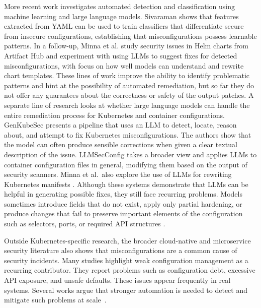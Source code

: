 \documentclass[preprint,12pt]{elsarticle}
\begin{document}
More recent work investigates automated detection and classification using machine learning and large language models. Sivaraman \cite{sivaraman2023mlk8s} shows that features extracted from YAML can be used to train classifiers that differentiate secure from insecure configurations, establishing that misconfigurations possess learnable patterns. In a follow-up, Minna et al. \cite{minna2025helmllm} study security issues in Helm charts from Artifact Hub and experiment with using LLMs to suggest fixes for detected misconfigurations, with focus on how well models can understand and rewrite chart templates. These lines of work improve the ability to identify problematic patterns and hint at the possibility of automated remediation, but so far they do not offer any guarantees about the correctness or safety of the output patches.
A separate line of research looks at whether large language models can handle the entire remediation process for Kubernetes and container configurations. GenKubeSec \cite{malul2024genkubesec} presents a pipeline that uses an LLM to detect, locate, reason about, and attempt to fix Kubernetes misconfigurations. The authors show that the model can often produce sensible corrections when given a clear textual description of the issue. LLMSecConfig \cite{ye2025llmsecconfig} takes a broader view and applies LLMs to container configuration files in general, modifying them based on the output of security scanners. Minna et al.\ also explore the use of LLMs for rewriting Kubernetes manifests \cite{minna2025helmllm}. Although these systems demonstrate that LLMs can be helpful in generating possible fixes, they still face recurring problems. Models sometimes introduce fields that do not exist, apply only partial hardening, or produce changes that fail to preserve important elements of the configuration such as selectors, ports, or required API structures \cite{minna2025helmllm, malul2024genkubesec, ye2025llmsecconfig}.

Outside Kubernetes-specific research, the broader cloud-native and microservice security literature also shows that misconfigurations are a common cause of security incidents. Many studies highlight weak configuration management as a recurring contributor. They report problems such as configuration debt, excessive API exposure, and unsafe defaults. These issues appear frequently in real systems. Several works argue that stronger automation is needed to detect and mitigate such problems at scale~\cite{haindl2024systematic, zhang2024devsecops, viswathan2024zero}.
\end{document}
